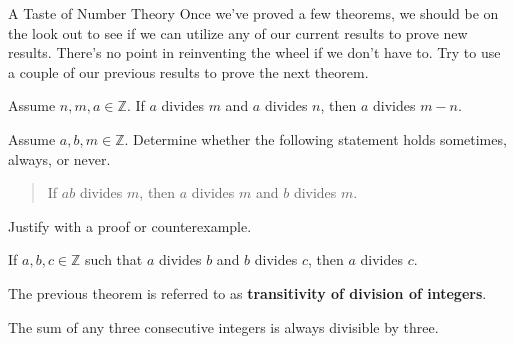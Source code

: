 \begin{section}{A Taste of Number Theory}
Once we've proved a few theorems, we should be on the look out to see if we can utilize any of our current results to prove new results.  There's no point in reinventing the wheel if we don't have to.  Try to use a couple of our previous results to prove the next theorem.

\begin{theorem}
Assume $n,m,a\in\mathbb{Z}$. If $a$ divides $m$ and $a$ divides $n$, then $a$ divides $m-n$.
\end{theorem}

\begin{problem}
Assume $a,b,m\in\mathbb{Z}$. Determine whether the following statement holds sometimes, always, or never.  
\begin{quote}
If $ab$ divides $m$, then $a$ divides $m$ and $b$ divides $m$.
\end{quote}
Justify with a proof or counterexample.
\end{problem}

\begin{theorem}
If $a,b,c\in\mathbb{Z}$ such that $a$ divides $b$ and $b$ divides $c$, then $a$ divides $c$.
\end{theorem}

The previous theorem is referred to as \textbf{transitivity of division of integers}.

\begin{theorem}\label{thm:sum of three consecutive integers}
The sum of any three consecutive integers is always divisible by three.
\end{theorem}

\end{section}